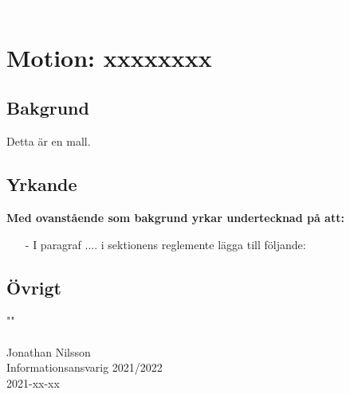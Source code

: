 \textcolor{white}{.} %



\section*{Motion: xxxxxxxx}
\subsection*{Bakgrund}
Detta är en mall. 
\subsection*{Yrkande}
\textbf{Med ovanstående som bakgrund yrkar undertecknad på att:}
\begin{itemize}
    \item[-] I paragraf .... i sektionens reglemente lägga till följande:
    
\end{itemize} 




\subsection*{Övrigt}
""\\


\noindent \makebox[2.5in]{\hrulefill} \\
\noindent Jonathan Nilsson\\
Informationsansvarig 2021/2022\\
2021-xx-xx
